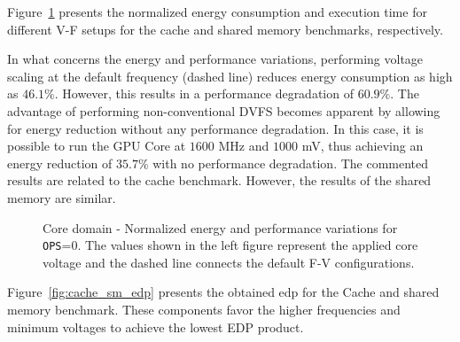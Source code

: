 Figure~\ref{fig:cache_sm_behaviour} presents the normalized energy consumption and execution time for different V-F setups for the cache and shared memory benchmarks, respectively.  

In what concerns the energy and performance variations, performing voltage scaling at the default frequency (dashed line) reduces energy consumption as high as $46.1\% $. However, this results in a performance degradation of $60.9\%$. The advantage of performing non-conventional DVFS becomes apparent by allowing for energy reduction without any performance degradation. In this case, it is possible to run the GPU Core at $1600$ MHz and $1000$ mV, thus achieving an energy reduction of $35.7\%$ with no performance degradation. The commented results are related to the cache benchmark. However, the results of the shared memory are similar.

\begin{figure}[!htb]
  \begin{subfigmatrix}{2}
  \end{subfigmatrix}
  \caption{Core domain - Normalized energy and performance variations for \texttt{OPS}=0. The  values shown in the left figure represent the applied core voltage and the dashed line connects the default F-V configurations.}
  \label{fig:cache_sm_behaviour}
\end{figure}


Figure~\ref{fig:cache_sm_edp} presents the obtained \acrshort{edp} for the Cache and shared memory benchmark. These components favor the higher frequencies and minimum voltages to achieve the lowest EDP product.

